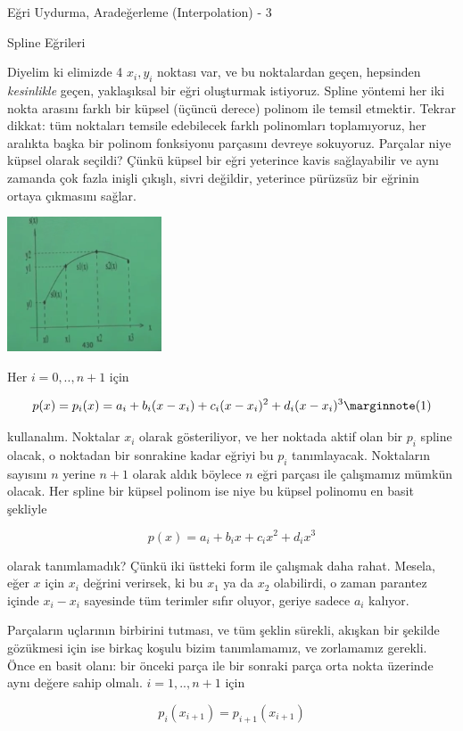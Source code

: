 \documentclass[12pt,fleqn]{article}\usepackage{../../common}
\begin{document}
Eğri Uydurma, Aradeğerleme (Interpolation) - 3

Spline Eğrileri

Diyelim ki elimizde 4 $x_i,y_i$ noktası var, ve bu noktalardan geçen,
hepsinden {\em kesinlikle} geçen, yaklaşıksal bir eğri oluşturmak
istiyoruz. Spline yöntemi her iki nokta arasını farklı bir küpsel (üçüncü
derece) polinom ile temsil etmektir. Tekrar dikkat: tüm noktaları temsile
edebilecek farklı polinomları toplamıyoruz, her aralıkta başka bir polinom
fonksiyonu parçasını devreye sokuyoruz. Parçalar niye küpsel olarak
seçildi? Çünkü küpsel bir eğri yeterince kavis sağlayabilir ve aynı zamanda
çok fazla inişli çıkışlı, sivri değildir, yeterince pürüzsüz bir eğrinin
ortaya çıkmasını sağlar.

\includegraphics[height=4cm]{spline1.png}

Her $i=0,..,n+1$ için 

$$ p(x) = p_i(x) = a_i + b_i(x-x_i) + c_i(x-x_i)^2 + d_i(x-x_i)^3
\mlabel{1}
$$

kullanalım. Noktalar $x_i$ olarak gösteriliyor, ve her noktada aktif olan
bir $p_i$ spline olacak, o noktadan bir sonrakine kadar eğriyi bu $p_i$
tanımlayacak. Noktaların sayısını $n$ yerine $n+1$ olarak aldık böylece $n$
eğri parçası ile çalışmamız mümkün olacak. Her spline bir küpsel polinom ise
niye bu küpsel polinomu en basit şekliyle

$$ p(x) = a_i + b_ix + c_ix^2 + d_ix^3 $$

olarak tanımlamadık? Çünkü iki üstteki form ile çalışmak daha
rahat. Mesela, eğer $x$ için $x_i$ değrini verirsek, ki bu $x_1$ ya da
$x_2$ olabilirdi, o zaman parantez içinde $x_i - x_i$ sayesinde tüm 
terimler sıfır oluyor, geriye sadece $a_i$ kalıyor. 

Parçaların uçlarının birbirini tutması, ve tüm şeklin sürekli, akışkan bir
şekilde gözükmesi için ise birkaç koşulu bizim tanımlamamız, ve zorlamamız
gerekli. Önce en basit olanı: bir önceki parça ile bir sonraki parça
orta nokta üzerinde aynı değere sahip olmalı. $i=1,..,n+1$ için

$$ p_i (x_{i+1}) = p_{i+1}(x_{i+1}) $$
\end{document}
